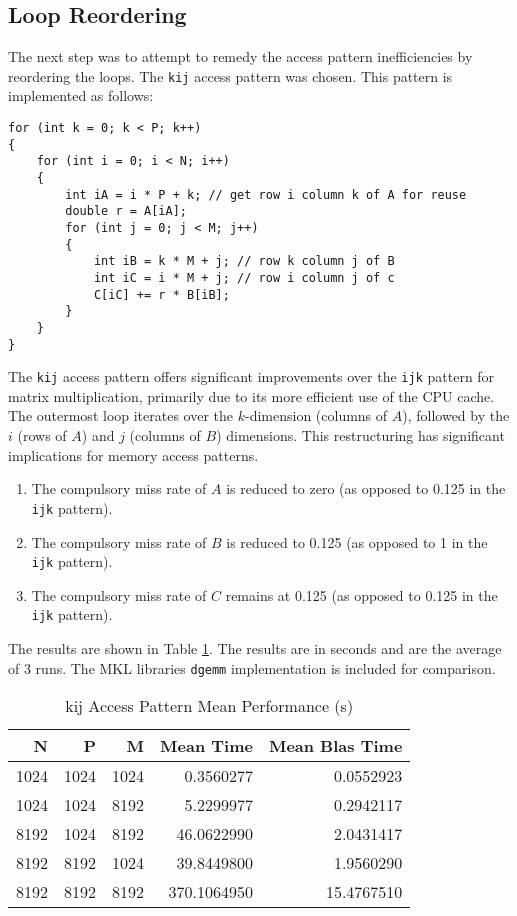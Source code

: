 \documentclass{article}
\begin{document}
\subsection{Loop Reordering}
The next step was to attempt to remedy the access pattern inefficiencies by reordering the loops. The 
\texttt{kij} access pattern was chosen. This pattern is implemented as follows:
\begin{lstlisting}
for (int k = 0; k < P; k++)
{
    for (int i = 0; i < N; i++)
    {
        int iA = i * P + k; // get row i column k of A for reuse
        double r = A[iA];
        for (int j = 0; j < M; j++)
        {
            int iB = k * M + j; // row k column j of B
            int iC = i * M + j; // row i column j of c
            C[iC] += r * B[iB];
        }
    }
}
\end{lstlisting}
\noindent The \texttt{kij} access pattern offers significant improvements over the \texttt{ijk} pattern for matrix multiplication, 
primarily due to its more efficient use of the CPU cache. The outermost loop iterates over the $k$-dimension (columns of $A$), followed by the $i$ (rows of $A$) and $j$ (columns of $B$) dimensions. 
This restructuring has significant implications for memory access patterns.
\begin{enumerate}
    \item The compulsory miss rate of $A$ is reduced to zero (as opposed to 0.125 in the \texttt{ijk} pattern). 
    \item The compulsory miss rate of $B$ is reduced to 0.125 (as opposed to 1 in the \texttt{ijk} pattern).
    \item The compulsory miss rate of $C$ remains at 0.125 (as opposed to 0.125 in the \texttt{ijk} pattern).
\end{enumerate}
The results are shown in Table \ref{TAB:REORDERED-RESULTS}. The results are in seconds and
are the average of 3 runs. The MKL libraries \texttt{dgemm} implementation is included for comparison.
\begin{table}[H]
    \centering
    \caption{kij Access Pattern Mean Performance (s)}
    \fontsize{12}{14}\selectfont
    \begin{tabular}[t]{rrrrr}
    \toprule
    N & P & M & Mean Time & Mean Blas Time\\
    \midrule
    1024 & 1024 & 1024 & 0.3560277 & 0.0552923\\
    1024 & 1024 & 8192 & 5.2299977 & 0.2942117\\
    8192 & 1024 & 8192 & 46.0622990 & 2.0431417\\
    8192 & 8192 & 1024 & 39.8449800 & 1.9560290\\
    8192 & 8192 & 8192 & 370.1064950 & 15.4767510\\
    \bottomrule
    \end{tabular}
    \label{TAB:REORDERED-RESULTS}
\end{table}
\end{document}
